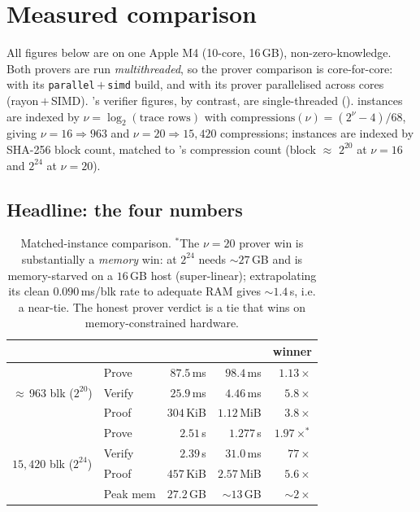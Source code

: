 \section{Measured comparison}
\label{sec:results}

All figures below are on one Apple M4 (10-core, 16\,GB), non-zero-knowledge.
Both provers are run \emph{multithreaded}, so the prover comparison is
core-for-core: \zinc{} with its \texttt{parallel}\,$+$\,\texttt{simd}
build, and \binius{} with its prover parallelised across cores
(rayon\,$+$\,SIMD). \binius{}'s verifier figures, by contrast, are
single-threaded ().
\zinc{} instances are indexed by $\nu = \log_2(\text{trace rows})$ with
$\mathrm{compressions}(\nu) = (2^{\nu}-4)/68$, giving $\nu{=}16
\Rightarrow 963$ and $\nu{=}20 \Rightarrow 15{,}420$ compressions;
\binius{} instances are indexed by SHA-256 block count, matched to
\zinc{}'s compression count (block $\approx$ $2^{20}$ at $\nu{=}16$ and
$2^{24}$ at $\nu{=}20$).

\subsection{Headline: the four numbers}
\label{sec:res-headline}

\begin{table}[t]
\centering
\renewcommand{\arraystretch}{1.2}
\begin{tabular}{@{}llrrr@{}}
\toprule
& & \binius{} & \zinc{} & winner \\
\midrule
\multirow{3}{*}{$\approx$\,963 blk ($2^{20}$)}
  & Prove   & $87.5$\,ms  & $98.4$\,ms  & \binius{} $1.13\times$ \\
  & Verify  & $25.9$\,ms  & $4.46$\,ms  & \zinc{} $5.8\times$ \\
  & Proof   & $304$\,KiB  & $1.12$\,MiB & \binius{} $3.8\times$ \\
\midrule
\multirow{4}{*}{$15{,}420$ blk ($2^{24}$)}
  & Prove   & $2.51$\,s   & $1.277$\,s  & \zinc{} $1.97\times^{\ast}$ \\
  & Verify  & $2.39$\,s   & $31.0$\,ms  & \zinc{} $77\times$ \\
  & Proof   & $457$\,KiB  & $2.57$\,MiB & \binius{} $5.6\times$ \\
  & Peak mem& $27.2$\,GB  & $\sim$$13$\,GB & \zinc{} $\sim$$2\times$ \\
\bottomrule
\end{tabular}
\caption{Matched-instance comparison. $^{\ast}$The $\nu{=}20$ prover win
is substantially a \emph{memory} win: \binius{} at $2^{24}$ needs
$\sim$$27$\,GB and is memory-starved on a $16$\,GB host (super-linear);
extrapolating its clean $0.090$\,ms/blk rate to adequate RAM gives
$\sim$$1.4$\,s, i.e. a near-tie. The honest prover verdict is a tie that
\zinc{} wins on memory-constrained hardware.}
\label{tab:headline}
\end{table}

